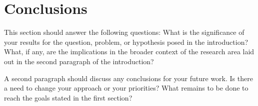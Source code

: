 \documentclass[11pt]{article}
\begin{document}
\section{Conclusions}


This section should answer the following questions:
What is the significance of your results for the question, problem, or
hypothesis posed in the introduction? What, if any, are the
implications in the broader context of the research area laid out in the
second paragraph of the introduction? 

A second paragraph should discuss any conclusions for your future work. 
Is there a need to change your approach or your priorities? What remains
to be done to reach the goals stated in the first section? 

\printbibliography
\end{document}
